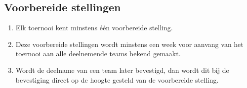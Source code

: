 \subsection{Voorbereide stellingen}

\begin{enumerate}
\item Elk toernooi kent minstens één voorbereide stelling.
\item Deze voorbereide stellingen wordt minstens een week voor aanvang van het toernooi aan alle deelnemende teams bekend gemaakt.
\item Wordt de deelname van een team later bevestigd, dan wordt dit bij de bevestiging direct op de hoogte gesteld van de voorbereide stelling.
\end{enumerate}
